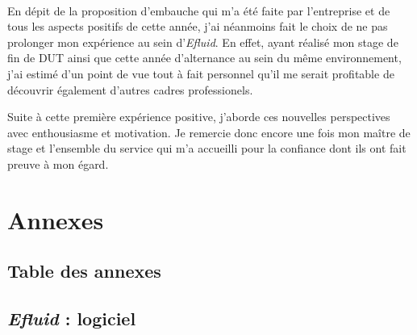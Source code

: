 \documentclass[a4paper, 12pt]{report}
\begin{document}
\begin{center}
  \noindent*\\
\end{center}

En dépit de la proposition d'embauche qui m'a été faite par l'entreprise et de tous les aspects positifs de cette année, j'ai néanmoins fait le choix de ne pas prolonger mon expérience au sein d'\textit{Efluid}. En effet, ayant réalisé mon stage de fin de DUT ainsi que cette année d'alternance au sein du même environnement, j'ai estimé d'un point de vue tout à fait personnel qu'il me serait profitable de découvrir également d'autres cadres professionels.

Suite à cette première expérience positive, j'aborde ces nouvelles perspectives avec enthousiasme et motivation. Je remercie donc encore une fois mon maître de stage et l'ensemble du service qui m'a accueilli pour la confiance dont ils ont fait preuve à mon égard.

\part{Annexes}
\renewcommand{\clearpage}{}
\chapter*{Table des annexes}
\renewcommand\ptctitle{}
\parttoc
\thispagestyle{empty}
\renewcommand{\clearpage}{\newpage}
\appendix

\chapter{\textit{Efluid} : logiciel}
\label{appendix:logiciel}
\end{document}
